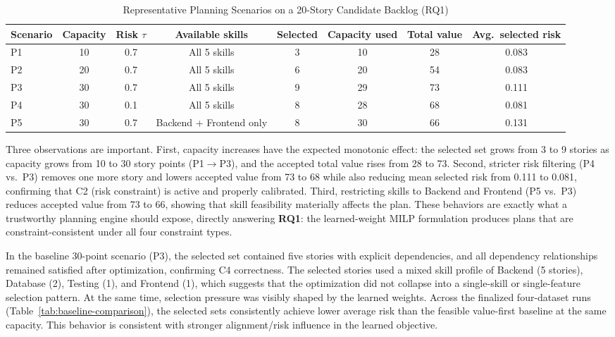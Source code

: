 \documentclass[conference]{IEEEtran}
\begin{document}
\begin{table}[t]
\caption{Representative Planning Scenarios on a 20-Story Candidate Backlog (RQ1)}
\label{tab:planning-scenarios}
\centering\small
\begin{tabular}{lccccccc}
\toprule
Scenario & Capacity & Risk $\tau$ & Available skills & Selected
          & Capacity used & Total value & Avg.\ selected risk \\
\midrule
P1 & 10 & 0.7 & All 5 skills            & 3 & 10 & 28 & 0.083 \\
P2 & 20 & 0.7 & All 5 skills            & 6 & 20 & 54 & 0.083 \\
P3 & 30 & 0.7 & All 5 skills            & 9 & 29 & 73 & 0.111 \\
P4 & 30 & 0.1 & All 5 skills            & 8 & 28 & 68 & 0.081 \\
P5 & 30 & 0.7 & Backend + Frontend only & 8 & 30 & 66 & 0.131 \\
\bottomrule
\end{tabular}
\end{table}

Three observations are important.
First, capacity increases have the expected monotonic effect: the selected set grows
from 3 to 9 stories as capacity grows from 10 to 30 story points (P1$\to$P3), and
the accepted total value rises from 28 to 73.
Second, stricter risk filtering (P4 vs.\ P3) removes one more story and lowers
accepted value from 73 to 68 while also reducing mean selected risk from 0.111 to
0.081, confirming that C2 (risk constraint) is active and properly calibrated.
Third, restricting skills to Backend and Frontend (P5 vs.\ P3) reduces accepted
value from 73 to 66, showing that skill feasibility materially affects the plan.
These behaviors are exactly what a trustworthy planning engine should expose,
directly answering \textbf{RQ1}: the learned-weight MILP formulation produces plans
that are constraint-consistent under all four constraint types.

In the baseline 30-point scenario (P3), the selected set contained five stories
with explicit dependencies, and all dependency relationships remained satisfied
after optimization, confirming C4 correctness.
The selected stories used a mixed skill profile of Backend (5 stories), Database
(2), Testing (1), and Frontend (1), which suggests that the optimization did not
collapse into a single-skill or single-feature selection pattern.
At the same time, selection pressure was visibly shaped by the learned weights.
Across the finalized four-dataset runs (Table~\ref{tab:baseline-comparison}),
the selected sets consistently achieve lower average risk than the feasible
value-first baseline at the same capacity.
This behavior is consistent with stronger alignment/risk influence in the learned
objective.
\end{document}
